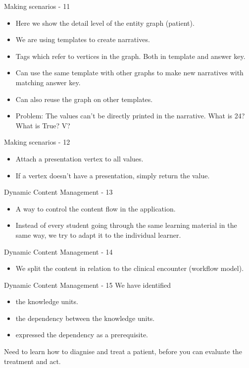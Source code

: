 \documentclass{beamer}
\begin{document}
\begin{frame}{Making scenarios - 11}
\begin{itemize}
	\item Here we show the detail level of the entity graph (patient).
	\item We are using templates to create narratives.
	\item Tags which refer to vertices in the graph. Both in template and answer key.
	\item Can use the same template with other graphs to make new narratives with matching answer key.
	\item Can also reuse the graph on other templates.
	\item Problem: The values can't be directly printed in the narrative. What is 24? What is True? V?
\end{itemize}
\end{frame}

\begin{frame}{Making scenarios - 12}
\begin{itemize}
\item Attach a presentation vertex to all values.
\item If a vertex doesn't have a presentation, simply return the value.
\end{itemize}
\end{frame}

\begin{frame}{Dynamic Content Management - 13}
\begin{itemize}
	\item A way to control the content flow in the application.
	\item Instead of every student going through the same learning material in the same way, we try to adapt it to the individual learner.
\end{itemize}
\end{frame}

\begin{frame}{Dynamic Content Management - 14}
\begin{itemize}
	\item We split the content in relation to the clinical encounter (workflow model).
\end{itemize}
\end{frame}

\begin{frame}{Dynamic Content Management - 15}
We have identified
\begin{itemize}
	\item  the knowledge units.
	\item the dependency between the knowledge units.
	\item expressed the dependency as a prerequisite.
\end{itemize}
Need to learn how to diagnise and treat a patient, before you can evaluate the treatment and act.
\end{frame}
\end{document}
